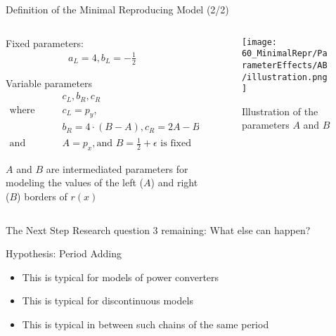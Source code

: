 \begin{frame}{Definition of the Minimal Reproducing Model (2/2)}
	\vspace{-1em}
	\begin{columns}
		\begin{column}{.7 \textwidth}
			Fixed parameters:
			\begin{align*}
				a_L = 4, b_L = -\frac{1}{2}
			\end{align*}

			Variable parameters
			\begin{align*}
				 & c_L, b_R, c_R                                                    \\
				\text{where} \qquad
				 & c_L = p_y,                                                       \\
				 & b_R = 4 \cdot (B - A), c_R = 2A - B                              \\
				\text {and} \qquad
				 & A = p_x, \text{and } B = \frac{1}{2} + \epsilon \text{ is fixed}
			\end{align*}

			$A$ and $B$ are intermediated parameters for modeling the values of the left ($A$) and right ($B$) borders of $r(x)$
		\end{column}
		\begin{column}{.3 \textwidth}
			\begin{figure}
				\centering
				\texttt{[image: 60\_MinimalRepr/ParameterEffects/AB/illustration.png]}
				\caption*{Illustration of the parameters $A$ and $B$}
			\end{figure}
		\end{column}
	\end{columns}
\end{frame}

\begin{frame}{The Next Step}
	Research question 3 remaining: What else can happen?

	\pause
	\vspace{2em}
	Hypothesis: Period Adding
	\begin{itemize}
		\item This is typical for models of power converters
		\item This is typical for discontinuous models
		\item This is typical in between such chains of the same period
	\end{itemize}
\end{frame}

